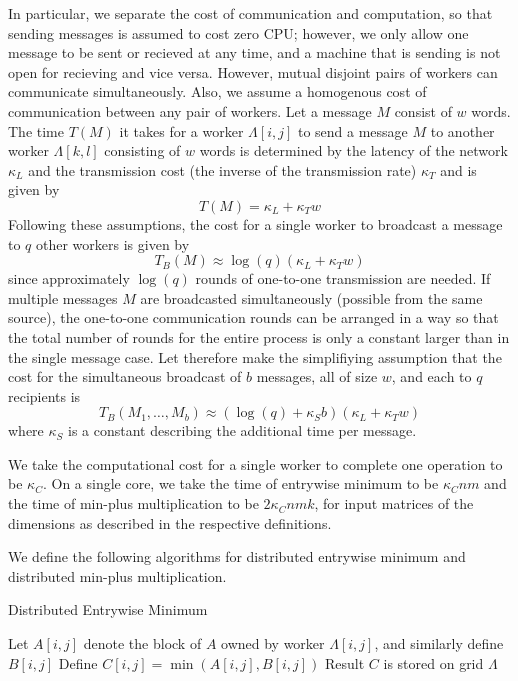 \documentclass{article} %
\begin{document}
In particular, we separate the cost of communication and computation,
so that sending messages is assumed to cost zero CPU; however, we only
allow one message to be sent or recieved at any time, and a machine
that is sending is not open for recieving and vice versa.  However,
mutual disjoint pairs of workers can communicate simultaneously.
Also, we assume a homogenous cost of communication between any pair of
workers.  Let a message $M$ consist of $w$ words.  The time $T(M)$ it
takes for a worker $\Lambda[i,j]$ to send a message $M$ to another
worker $\Lambda[k,l]$ consisting of $w$ words is determined by the
latency of the network $\kappa_L$ and the transmission cost (the
inverse of the transmission rate) $\kappa_T$ and is given by
\[
T(M) = \kappa_L + \kappa_T w
\]
Following these assumptions, the cost for a single worker to broadcast
a message to $q$ other workers is given by
\[
T_B(M) \approx \log(q) (\kappa_L + \kappa_T w) 
\]
since approximately $\log(q)$ rounds of one-to-one transmission are
needed.  If multiple messages $M$ are broadcasted simultaneously
(possible from the same source), the one-to-one communication rounds
can be arranged in a way so that the total number of rounds for the
entire process is only a constant larger than in the single message
case.  Let therefore make the simplifiying assumption that the cost
for the simultaneous broadcast of $b$ messages, all of size $w$, and
each to $q$ recipients is
\[
T_B(M_1,\hdots, M_b) \approx (\log(q) + \kappa_S b)(\kappa_L + \kappa_T w) 
\]
where $\kappa_S$ is a constant describing the additional time per
message.

We take the computational cost for a single worker to complete one
operation to be $\kappa_C$.  On a single core, we take the time of
entrywise minimum to be $\kappa_C nm$ and the time of min-plus
multiplication to be $2\kappa_C nmk$, for input matrices of the
dimensions as described in the respective definitions.

We define the following algorithms for distributed entrywise minimum
and distributed min-plus multiplication.

\begin{algorithm}[H]
\caption{Distributed Entrywise Minimum}
\begin{algorithmic}
  \State Let $A[i, j]$ denote the block of $A$ owned by worker $\Lambda[i, j]$, and similarly define $B[i, j]$
    \State Define $C[i, j] = \min(A[i, j], B[i, j])$
  \EndFor
  \State Result $C$ is stored on grid $\Lambda$
\EndFunction
\end{algorithmic}
\end{algorithm}
\end{document}
